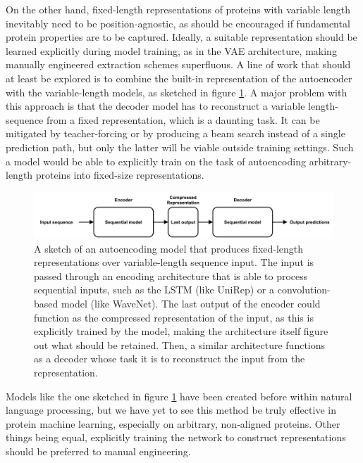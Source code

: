 On the other hand, fixed-length representations of proteins with variable length inevitably need to be position-agnostic, as should be encouraged if fundamental protein properties are to be captured. Ideally, a suitable representation should be learned explicitly during model training, as in the VAE architecture, making manually engineered extraction schemes superfluous. A line of work that should at least be explored is to combine the built-in representation of the autoencoder with the variable-length models, as sketched in figure \ref{fig:sketch}. A major problem with this approach is that the decoder model has to reconstruct a variable length-sequence from a fixed representation, which is a daunting task. It can be mitigated by teacher-forcing or by producing a beam search instead of a single prediction path, but only the latter will be viable outside training settings. Such a model would be able to explicitly train on the task of autoencoding arbitrary-length proteins into fixed-size representations. 
\begin{figure}[H]
    \centering
    \includegraphics[width = \linewidth]{report/figures/sketch.pdf}
    \caption{A sketch of an autoencoding model that produces fixed-length representations over variable-length sequence input. The input is passed through an encoding architecture that is able to process sequential inputs, such as the LSTM (like UniRep) or a convolution-based model (like WaveNet). The last output of the encoder could function as the compressed representation of the input, as this is explicitly trained by the model, making the architecture itself figure out what should be retained. Then, a similar architecture functions as a decoder whose task it is to reconstruct the input from the representation.}
    \label{fig:sketch}
\end{figure}

Models like the one sketched in figure \ref{fig:sketch} have been created before within natural language processing, but we have yet to see this method be truly effective in protein machine learning, especially on arbitrary, non-aligned proteins. Other things being equal, explicitly training the network to construct representations should be preferred to manual engineering. 

